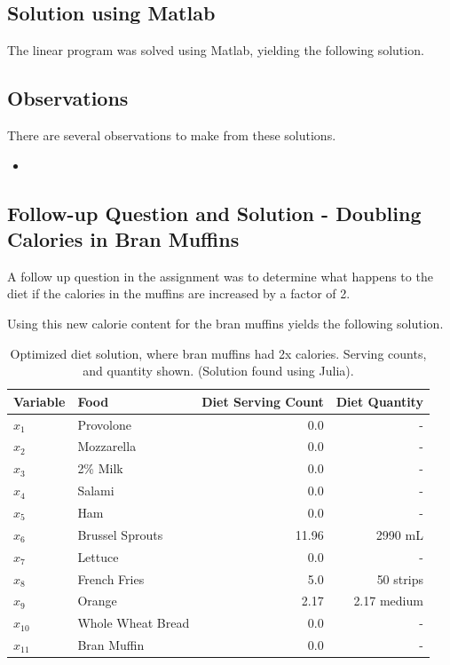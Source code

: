 \documentclass{article}
\begin{document}
    \subsection{Solution using Matlab}

    The linear program was solved using Matlab, yielding the following solution.


    \subsection{Observations}

    There are several observations to make from these solutions.

    \begin{itemize}
        \item 
    \end{itemize}

    \subsection{Follow-up Question and Solution - Doubling Calories in Bran Muffins}

    A follow up question in the assignment was to determine what happens to the diet if the calories in the muffins are increased by a factor of 2.

    Using this new calorie content for the bran muffins yields the following solution.


    \begin{table}[H]
        \centering
        \begin{tabular}{@{}llrr@{}}
        \toprule
        Variable & Food & Diet Serving Count & Diet Quantity \\ \midrule
        $x_1$    & Provolone         & 0.0  & - \\
        $x_2$    & Mozzarella        & 0.0  & - \\
        $x_3$    & 2\% Milk          & 0.0  & - \\
        $x_4$    & Salami            & 0.0  & - \\
        $x_5$    & Ham               & 0.0  & - \\
        $x_6$    & Brussel Sprouts   & 11.96 & 2990 mL \\
        $x_7$    & Lettuce           & 0.0  & - \\
        $x_8$    & French Fries      & 5.0  & 50 strips \\
        $x_9$    & Orange            & 2.17 & 2.17 medium \\
        $x_{10}$ & Whole Wheat Bread & 0.0  & - \\
        $x_{11}$ & Bran Muffin       & 0.0 & - \\ \bottomrule
        \end{tabular}
        \caption{Optimized diet solution, where bran muffins had 2x calories. Serving counts, and quantity shown. (Solution found using Julia). }
        \label{tab:Q1_doublecalmuffins_solution}
    \end{table}
\end{document}
